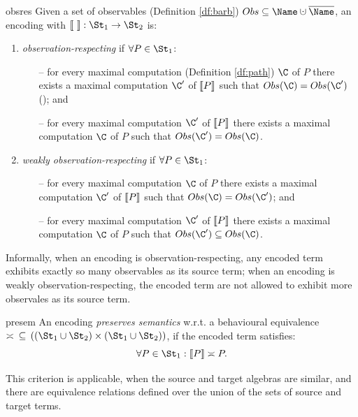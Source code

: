 \documentclass[adraft,hidelinks]{eptcs}
\begin{document}
\begin{criterion}{obsres} \cite{IP08, VBG09}
  Given a set of observables (Definition \ref{df:barb}) $Obs\subseteq\Name\dcup\overline{\Name}$, an encoding with $\bkt{\ }: \St_1\to\St_2$ is:
  \begin{enumerate}
    \item \label{sobsres} \emph{observation-respecting} if $\forall P \in \St_1$:
      \begin{itemize}
        \item[--] for every maximal computation (Definition \ref{df:path}) $\C$ of $P$ there exists a maximal computation $\C'$ of $\bkt{P}$ such that $\Ob{\C} = \Ob{\C'}$ (); and
        \item[--] for every maximal computation $\C'$ of $\bkt{P}$ there exists a maximal computation $\C$ of $P$ such that $\Ob{\C'} = \Ob{\C}$.
      \end{itemize}
    \item \label{wobsres} \emph{weakly observation-respecting} if $\forall P \in \St_1$:
      \begin{itemize}
        \item[--] for every maximal computation $\C$ of $P$ there exists a maximal computation $\C'$ of $\bkt{P}$ such that $\Ob{\C} = \Ob{\C'}$; and
        \item[--] for every maximal computation $\C'$ of $\bkt{P}$ there exists a maximal computation $\C$ of $P$ such that $\Ob{\C'} \subseteq \Ob{\C}$.
      \end{itemize}
  \end{enumerate}
\end{criterion}

Informally, when an encoding is observation-respecting, any encoded term exhibits exactly so many observables as its source term; when an encoding is weakly observation-respecting, the encoded term are not allowed to exhibit more observales as its source term.

\begin{criterion}{presem} \cite{JP08}
  An encoding \emph{preserves semantics} w.r.t. a behavioural equivalence $\asymp\,\ \subseteq\,  ((\St_1\cup\St_2)\times(\St_1\cup\St_2))$, if the encoded term satisfies:
  \[
    \forall P \in \St_1: \bkt{P} \asymp P.
  \]
\end{criterion}

This criterion is applicable, when the source and target algebras are similar, and there are equivalence relations defined over the union of the sets of source and target terms.
\end{document}
